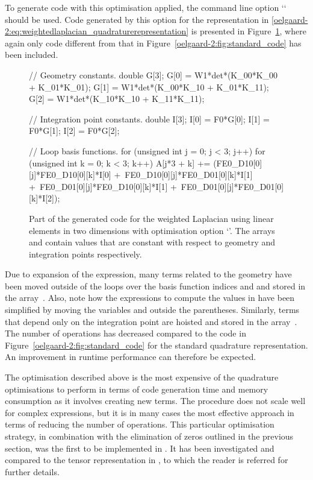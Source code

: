 To generate code with this optimisation applied,
the \ffc{} command line option `` should be used.
Code generated by this option for the representation in
\eqref{oelgaard-2:eq:weightedlaplacian_quadraturerepresentation} is presented in
Figure~\ref{oelgaard-2:fig:O_simplify_code}, where again only code different
from that in Figure~\ref{oelgaard-2:fig:standard_code} has been included.
%
\begin{figure}
\begin{code}
// Geometry constants.
double G[3];
G[0] = W1*det*(K_00*K_00 + K_01*K_01);
G[1] = W1*det*(K_00*K_10 + K_01*K_11);
G[2] = W1*det*(K_10*K_10 + K_11*K_11);

// Integration point constants.
double I[3];
I[0] = F0*G[0];
I[1] = F0*G[1];
I[2] = F0*G[2];

// Loop basis functions.
for (unsigned int j = 0; j < 3; j++)
{
 for (unsigned int k = 0; k < 3; k++)
 {
  A[j*3 + k] += (FE0_D10[0][j]*FE0_D10[0][k]*I[0] +\
                 FE0_D10[0][j]*FE0_D01[0][k]*I[1] +\
                 FE0_D01[0][j]*FE0_D10[0][k]*I[1] +\
                 FE0_D01[0][j]*FE0_D01[0][k]*I[2]);
 }
}
\end{code}
\caption{Part of the generated code for the weighted Laplacian using linear
         elements in two dimensions with optimisation option
         `'.
         The arrays \emp{G} and \emp{I} contain values that are constant with
         respect to geometry and integration points respectively.}
\label{oelgaard-2:fig:O_simplify_code}
\end{figure}
%
Due to expansion of the expression, many terms related to the geometry have been
moved outside of the loops over the basis function indices  and  and
stored in the array~.
Also, note how the expressions to compute the values in \emp{G} have been
simplified by moving the variables \emp{det} and \emp{W1} outside the
parentheses.
Similarly, terms that depend only on the integration point are hoisted and
stored in the array~\emp{I}.
The number of operations has decreased compared to the
code in Figure~\ref{oelgaard-2:fig:standard_code} for the standard quadrature
representation. An improvement in runtime performance can therefore be
expected.

The optimisation described above is the most expensive of the quadrature
optimisations to perform in terms of \ffc{} code generation time
and memory consumption as it involves creating new terms.
The procedure does not scale well for complex expressions, but it is in many
cases the most effective approach in terms of reducing the number of operations.
This particular optimisation strategy, in combination with the
elimination of zeros outlined in the previous section, was the first to be
implemented in \ffc{}.
It has been investigated and compared to the tensor representation in
\citet{oelgaard:2010}, to which the reader is referred for further details.
%
